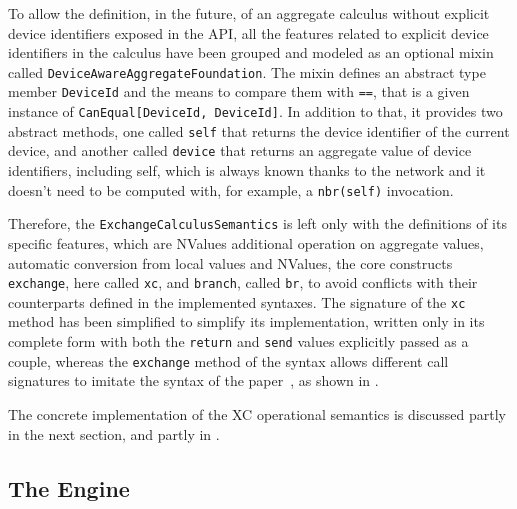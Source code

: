 To allow the definition, in the future, of an aggregate calculus without explicit device identifiers exposed in the \ac{API}, all the features related to explicit device identifiers in the calculus have been grouped and modeled as an optional mixin called \texttt{DeviceAwareAggregateFoundation}.
%
The mixin defines an abstract type member \texttt{DeviceId} and the means to compare them with \texttt{==}, that is a given instance of \texttt{CanEqual[DeviceId, DeviceId]}.
%
In addition to that, it provides two abstract methods, one called \texttt{self} that returns the device identifier of the current device, and another called \texttt{device} that returns an aggregate value of device identifiers, including self, which is always known thanks to the network and it doesn't need to be computed with, for example, a \texttt{nbr(self)} invocation.

Therefore, the \texttt{ExchangeCalculusSemantics} is left only with the definitions of its specific features, which are NValues additional operation on aggregate values, automatic conversion from local values and NValues, the core constructs \texttt{exchange}, here called \texttt{xc}, and \texttt{branch}, called \texttt{br}, to avoid conflicts with their counterparts defined in the implemented syntaxes.
%
The signature of the \texttt{xc} method has been simplified to simplify its implementation, written only in its complete form with both the \texttt{return} and \texttt{send} values explicitly passed as a couple, whereas the \texttt{exchange} method of the syntax allows different call signatures to imitate the syntax of the paper~\cite{xc}, as shown in .



The concrete implementation of the \ac{XC} operational semantics is discussed partly in the next section, and partly in .

\subsection{The Engine} \label{chap:design->sec:final-dsl->subsec:engine}

